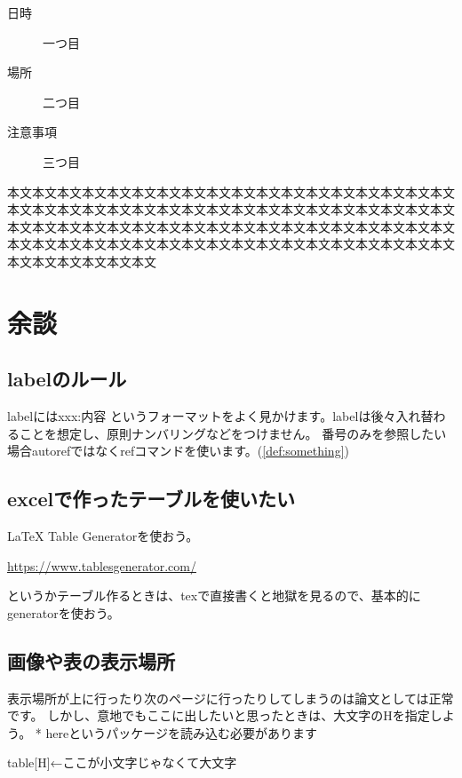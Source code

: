\begin{description}
  \item[日時] 一つ目
  \item[場所] 二つ目
  \item[注意事項] 三つ目
\end{description}


本文本文本文本文本文本文本文本文本文本文本文本文本文本文本文本文本文本文本文本文本文本文本文本文本文本文本文本文本文本文本文本文本文本文本文本文本文本文本文本文本文本文本文本文本文本文本文本文本文本文本文本文本文本文本文本文本文本文本文本文本文本文本文本文本文本文本文本文本文本文本文本文本文本文本文本文本文本文

\section{余談}


\subsection{labelのルール}

labelにはxxx:内容 というフォーマットをよく見かけます。labelは後々入れ替わることを想定し、原則ナンバリングなどをつけません。
番号のみを参照したい場合autorefではなくrefコマンドを使います。(\ref{def:something})

\subsection{excelで作ったテーブルを使いたい}

LaTeX Table Generatorを使おう。

\url{https://www.tablesgenerator.com/}

というかテーブル作るときは、texで直接書くと地獄を見るので、基本的にgeneratorを使おう。

\subsection{画像や表の表示場所}

表示場所が上に行ったり次のページに行ったりしてしまうのは論文としては正常です。
しかし、意地でもここに出したいと思ったときは、大文字のHを指定しよう。
* hereというパッケージを読み込む必要があります

table{}[H]←ここが小文字じゃなくて大文字

